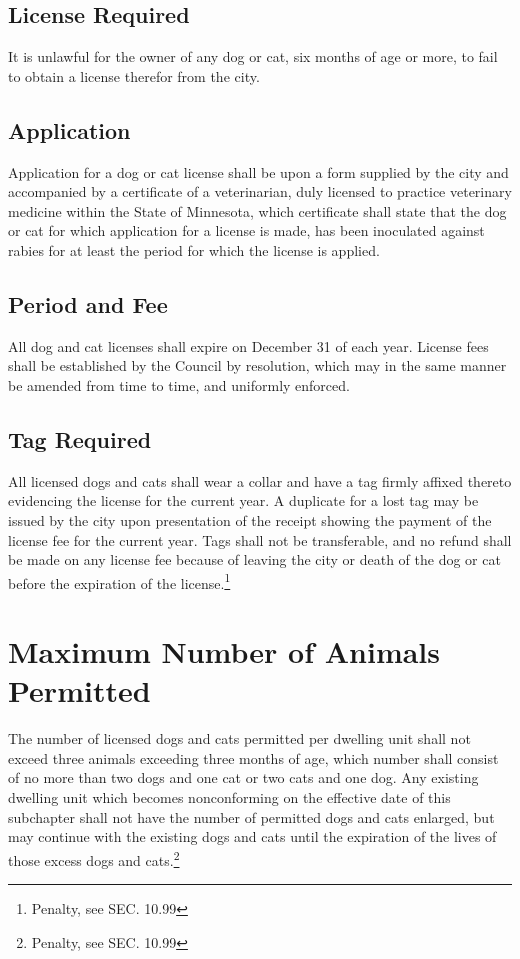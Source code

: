 \subsection{License Required}
It is unlawful for the owner of any dog or cat, six months of age or more, to fail to obtain a license therefor from the city.
\subsection{Application}
Application for a dog or cat license shall be upon a form supplied by the city and accompanied by a certificate of a veterinarian, duly licensed to practice veterinary medicine within the State of Minnesota, which certificate shall state that the dog or cat for which application for a license is made, has been inoculated against rabies for at least the period for which the license is applied.
\subsection{Period and Fee}
All dog and cat licenses shall expire on December 31 of each year.  License fees shall be established by the Council by resolution, which may in the same manner be amended from time to time, and uniformly enforced.
\subsection{Tag Required}
All licensed dogs and cats shall wear a collar and have a tag firmly affixed thereto evidencing the license for the current year.  A duplicate for a lost tag may be issued by the city upon presentation of the receipt showing the payment of the license fee for the current year.  Tags shall not be transferable, and no refund shall be made on any license fee because of leaving the city or death of the dog or cat before the expiration of the license.\footnote{Penalty, see SEC. 10.99}

\section{Maximum Number of Animals Permitted}
The number of licensed dogs and cats permitted per dwelling unit shall not exceed three animals exceeding three months of age, which number shall consist of no more than two dogs and one cat or two cats and one dog. Any existing dwelling unit which becomes nonconforming on the effective date of this subchapter shall not have the number of permitted dogs and cats enlarged, but may continue with the existing dogs and cats until the expiration of the lives of those excess dogs and cats.\footnote{Penalty, see SEC. 10.99}

